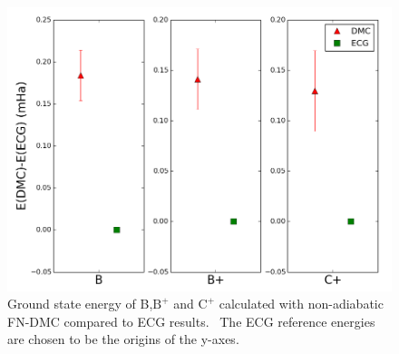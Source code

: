 \documentclass[pra,superscriptaddress,groupedaddress,twocolumn]{revtex4}
\begin{document}
\begin{figure}
\centering
\includegraphics[scale=.4]{Figures/atom-ECG}
\caption{Ground state energy of B,$\text{B}^+$ and $\text{C}^+$ calculated with non-adiabatic FN-DMC compared to ECG results.~\cite{Bubin_B,Bubin_B+,Bubin_C+} The ECG reference energies are chosen to be the origins of the y-axes.}
\end{figure}
\end{document}
